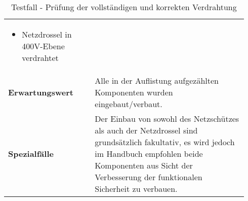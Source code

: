 \documentclass[../../../Bachelorarbeit.tex]{subfiles}
\begin{document}
\begin{table}[H]
\begin{tabular}{ p{0.34\linewidth}  p{0.6\linewidth} }
{\begin{itemize}[noitemsep,topsep=0pt,parsep=0pt,partopsep=0pt,leftmargin=*]
                                                \item Netzdrossel in 400V-Ebene verdrahtet
                                            \end{itemize}} \\
        \textbf{Erwartungswert}         & Alle in der Auflistung aufgezählten Komponenten wurden eingebaut/verbaut. \\
        \textbf{Spezialfälle}           & Der Einbau von sowohl des Netzschützes als auch der Netzdrossel sind grundsätzlich fakultativ, es wird jedoch im Handbuch empfohlen beide Komponenten aus Sicht der Verbesserung der funktionalen Sicherheit zu verbauen. \\ \hline
    \end{tabular}
    \caption[\acs{tf} - Verdrahtungsprüfung]{Testfall - Prüfung der vollständigen und korrekten Verdrahtung}
    \label{tab:my-table61}
\end{table}
\end{document}
